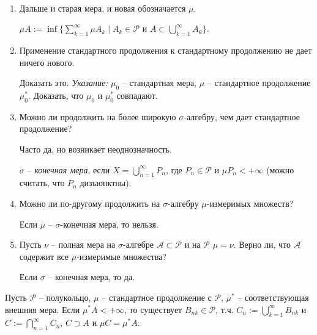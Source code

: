 \begin{remark}~
    \begin{enumerate}
        \item Дальше и старая мера, и новая обозначается $\mu$.
        
        $\mu A:=\inf \{\sum\limits_{k=1}^\infty \mu A_k\mid A_k\in \mathcal{P}\text{ и } A\subset \bigcup\limits_{k=1}^\infty A_k\}$.

        \item Применение стандартного продолжения к стандартному продолжению не дает ничего нового.

        \begin{exercise}
            Доказать это. \textit{Указание:} $\mu_0$ – стандартная мера, $\mu$ – стандартное продолжение $\mu_0^*$. 
            Доказать, что $\mu_0$ и $\mu_0^*$ совпадают.
        \end{exercise}
        
        \item Можно ли продолжить на более широкую $\sigma$-алгебру, чем дает стандартное продолжение?
        
        Часто да, но возникает неоднозначность.
        
        \begin{definition}
            $\sigma$ – \textit{конечная мера}, если $X=\bigcup\limits_{n=1}^\infty P_n$, где $P_n\in \mathcal{P}$ и 
            $\mu P_n <+\infty$ (можно считать, что $P_n$ дизъюнктны).
        \end{definition}
        
        \item Можно ли по-другому продолжить на $\sigma$-алгебру $\mu$-измеримых множеств?
        
        Если $\mu$ – $\sigma$-конечная мера, то нельзя.

        \item Пусть $\nu$ – полная мера на $\sigma$-алгебре $\mathcal{A}\subset \mathcal{P}$ и на $\mathcal{P}$ $\mu=\nu$.
        Верно ли, что $\mathcal{A}$ содержит все $\mu$-измеримые множества? 
        
        Если $\sigma$ – конечная мера, то да.
    \end{enumerate}
\end{remark}

\begin{theorem}
    Пусть $\mathcal{P}$ – полукольцо, $\mu$ – стандартное продолжение с $\mathcal{P}$, $\mu^*$ – соответствующая внешняя мера.
    Если $\mu^* A<+\infty$, то существует $B_{nk}\in \mathcal{P}$, т.ч. $C_n:=\bigcup\limits_{k=1}^\infty B_{nk}$ и 
    $C:=\bigcap\limits_{n=1}^\infty C_n$, $C\supset A$ и $\mu C=\mu^* A$.
\end{theorem}

